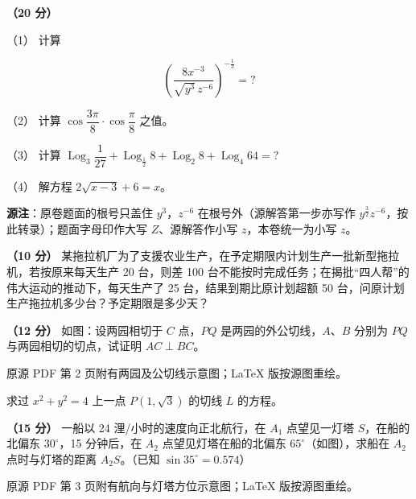\begin{question}
\textbf{（20 分）} 

（1） 计算

\nopagebreak[4]
\[
\left(\frac{8x^{-3}}{\sqrt{y^{3}}\,z^{-6}}\right)^{-\frac13}=?
\]

（2） 计算 $\cos\dfrac{3\pi}{8}\cdot\cos\dfrac{\pi}{8}$ 之值。

（3） 计算 $\operatorname{Log}_3\dfrac{1}{27}+\operatorname{Log}_{\frac12}8+\operatorname{Log}_2 8+\operatorname{Log}_4 64=$?

（4） 解方程 $2\sqrt{x-3}+6=x$。

\begin{gktip}
\textbf{源注}：原卷题面的根号只盖住 $y^{3}$，$z^{-6}$ 在根号外（源解答第一步亦写作 $y^{\frac32}z^{-6}$，按此转录）；题面字母印作大写 $Z$、源解答作小写 $z$，本卷统一为小写 $z$。
\end{gktip}

\end{question}
\begin{question}
\textbf{（10 分）} 某拖拉机厂为了支援农业生产，在予定期限内计划生产一批新型拖拉机，若按原来每天生产 20 台，则差 100 台不能按时完成任务；在揭批“四人帮”的伟大运动的推动下，每天生产了 25 台，结果到期比原计划超额 50 台，问原计划生产拖拉机多少台？予定期限是多少天？

\Needspace{0.4\textheight}
\end{question}
\begin{question}
\textbf{（12 分）} 如图：设两园相切于 $C$ 点，$PQ$ 是两园的外公切线，$A$、$B$ 分别为 $PQ$ 与两园相切的切点，试证明 $AC\perp BC$。

\begin{gktip}
原源 PDF 第 2 页附有两园及公切线示意图；LaTeX 版按源图重绘。
\end{gktip}
\nopagebreak[4]
\begin{center}\end{center}
\nopagebreak[4]
\end{question}
\begin{question}
求过 $x^2+y^2=4$ 上一点 $P(1,\sqrt3)$ 的切线 $L$ 的方程。

\Needspace{0.4\textheight}
\end{question}
\begin{question}
\textbf{（15 分）} 一船以 24 浬/小时的速度向正北航行，在 $A_1$ 点望见一灯塔 $S$，在船的北偏东 $30^\circ$，15 分钟后，在 $A_2$ 点望见灯塔在船的北偏东 $65^\circ$（如图），求船在 $A_2$ 点时与灯塔的距离 $A_2S$。（已知 $\sin35^\circ=0.574$）

\begin{gktip}
原源 PDF 第 3 页附有航向与灯塔方位示意图；LaTeX 版按源图重绘。
\end{gktip}
\nopagebreak[4]
\begin{center}\end{center}
\nopagebreak[4]
\Needspace{0.4\textheight}
\end{question}
